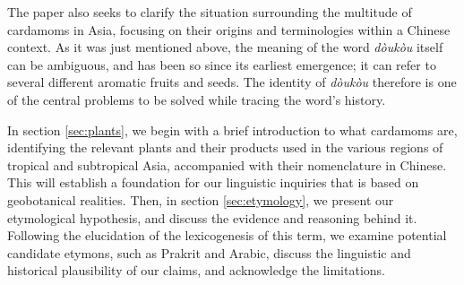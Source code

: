 \documentclass[12pt]{article}
\newcommand{\tc}[1]{\traditionalchinesefont{#1}\rmfamily}
\begin{document}




The paper also seeks to clarify the situation surrounding the multitude of cardamoms in Asia, focusing on their origins and terminologies within a Chinese context. As it was just mentioned above, the meaning of the word \textit{dòukòu} itself can be ambiguous, and has been so since its earliest emergence; it can refer to several different aromatic fruits and seeds. The identity of \textit{dòukòu} therefore is one of the central problems to be solved while tracing the word's history.


In section \ref{sec:plants}, we begin with a brief introduction to what cardamoms are, identifying the relevant plants and their products used in the various regions of tropical and subtropical Asia, accompanied with their nomenclature in Chinese. This will establish a foundation for our linguistic inquiries that is based on geobotanical realities. Then, in section \ref{sec:etymology}, we present our etymological hypothesis, and discuss the evidence and reasoning behind it. Following the elucidation of the lexicogenesis of this term, we examine potential candidate etymons, such as Prakrit and Arabic, discuss the linguistic and historical plausibility of our claims, and acknowledge the limitations.
\end{document}
